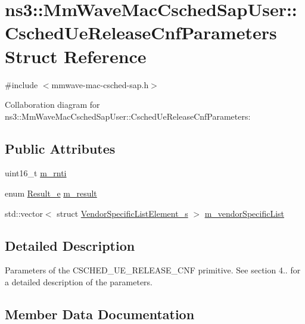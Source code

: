 \hypertarget{structns3_1_1MmWaveMacCschedSapUser_1_1CschedUeReleaseCnfParameters}{}\section{ns3\+:\+:Mm\+Wave\+Mac\+Csched\+Sap\+User\+:\+:Csched\+Ue\+Release\+Cnf\+Parameters Struct Reference}
\label{structns3_1_1MmWaveMacCschedSapUser_1_1CschedUeReleaseCnfParameters}


{\ttfamily \#include $<$mmwave-\/mac-\/csched-\/sap.\+h$>$}



Collaboration diagram for ns3\+:\+:Mm\+Wave\+Mac\+Csched\+Sap\+User\+:\+:Csched\+Ue\+Release\+Cnf\+Parameters\+:
\subsection*{Public Attributes}
\begin{DoxyCompactItemize}
\item 
uint16\+\_\+t \hyperlink{structns3_1_1MmWaveMacCschedSapUser_1_1CschedUeReleaseCnfParameters_a804cc0c9ee5bf00e718d45174ad2e3e8}{m\+\_\+rnti}
\item 
enum \hyperlink{namespacens3_a7acf2b7f9e0781dfe43a6bc54d6ecd07}{Result\+\_\+e} \hyperlink{structns3_1_1MmWaveMacCschedSapUser_1_1CschedUeReleaseCnfParameters_af430beb197bfaf4c2408692c6a7c7e69}{m\+\_\+result}
\item 
std\+::vector$<$ struct \hyperlink{structns3_1_1VendorSpecificListElement__s}{Vendor\+Specific\+List\+Element\+\_\+s} $>$ \hyperlink{structns3_1_1MmWaveMacCschedSapUser_1_1CschedUeReleaseCnfParameters_a10d3cf5e2c8eba4be7bfa38ccf746afd}{m\+\_\+vendor\+Specific\+List}
\end{DoxyCompactItemize}


\subsection{Detailed Description}
Parameters of the C\+S\+C\+H\+E\+D\+\_\+\+U\+E\+\_\+\+R\+E\+L\+E\+A\+S\+E\+\_\+\+C\+NF primitive. See section 4.. for a detailed description of the parameters. 

\subsection{Member Data Documentation}
